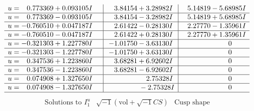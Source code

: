 \documentclass[1p]{elsarticle_modified}
\theoremstyle{definition}
\newcommand{\I}{\sqrt{-1}}
\begin{document}
$$\begin{array}{c|c|c}
\begin{aligned}
u &= \phantom{-}0.773369 + 0.093105 I\end{aligned}
 & \phantom{-}3.84154 + 3.28982 I & \phantom{-}5.14819 - 5.68985 I \\ \hline\begin{aligned}
u &= \phantom{-}0.773369 - 0.093105 I\end{aligned}
 & \phantom{-}3.84154 - 3.28982 I & \phantom{-}5.14819 + 5.68985 I \\ \hline\begin{aligned}
u &= -0.760510 + 0.047187 I\end{aligned}
 & \phantom{-}2.61422 - 0.28130 I & \phantom{-}2.27770 - 1.35961 I \\ \hline\begin{aligned}
u &= -0.760510 - 0.047187 I\end{aligned}
 & \phantom{-}2.61422 + 0.28130 I & \phantom{-}2.27770 + 1.35961 I \\ \hline\begin{aligned}
u &= -0.321303 + 1.227780 I\end{aligned}
 & -1.01750 - 3.63130 I & \phantom{-0.000000 } 0 \\ \hline\begin{aligned}
u &= -0.321303 - 1.227780 I\end{aligned}
 & -1.01750 + 3.63130 I & \phantom{-0.000000 } 0 \\ \hline\begin{aligned}
u &= \phantom{-}0.347536 + 1.223860 I\end{aligned}
 & \phantom{-}3.68281 + 6.92602 I & \phantom{-0.000000 } 0 \\ \hline\begin{aligned}
u &= \phantom{-}0.347536 - 1.223860 I\end{aligned}
 & \phantom{-}3.68281 - 6.92602 I & \phantom{-0.000000 } 0 \\ \hline\begin{aligned}
u &= \phantom{-}0.074908 + 1.327650 I\end{aligned}
 & \phantom{-0.000000 -}2.75328 I & \phantom{-0.000000 } 0 \\ \hline\begin{aligned}
u &= \phantom{-}0.074908 - 1.327650 I\end{aligned}
 & \phantom{-0.000000 } -2.75328 I & \phantom{-0.000000 } 0\\
 \hline 
 \end{array}$$\newpage$$\begin{array}{c|c|c}  
\text{Solutions to }I^u_{1}& \I (\text{vol} + \sqrt{-1}CS) & \text{Cusp shape}\\

\end{array}$$
\end{document}
